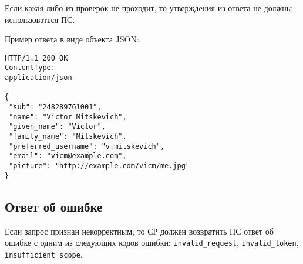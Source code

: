 Если какая-либо из проверок не проходит, то утверждения из ответа 
не должны использоваться ПС. 
 
Пример ответа в виде объекта JSON:
%
\begin{lstlisting}
HTTP/1.1 200 OK
ContentType:
application/json

{
 "sub": "248289761001",
 "name": "Victor Mitskevich",
 "given_name": "Victor",
 "family_name": "Mitskevich",
 "preferred_username": "v.mitskevich",
 "email": "vicm@example.com",
 "picture": "http://example.com/vicm/me.jpg"
}
\end{lstlisting}

\subsection{Ответ об ошибке}\label{REQRESP.UserInfo.Error}

Если запрос признан некорректным, то СР должен возвратить ПС 
ответ об ошибке с одним из следующих кодов ошибки: 
\lstinline{invalid_request},
\lstinline{invalid_token}, 
\lstinline{insufficient_scope}. 

